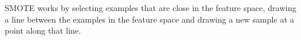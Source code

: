 \documentclass{article}
\begin{document}
\begin{figure}[h]
\begin{minipage}[h]{0.49\linewidth}
\end{minipage}
\hfill
\begin{minipage}[h]{0.49\linewidth}
\end{minipage}
\end{figure}

SMOTE works by selecting examples that are close in the feature space, drawing a line between the examples in the feature space and drawing a new sample at a point along that line. 
\end{document}
